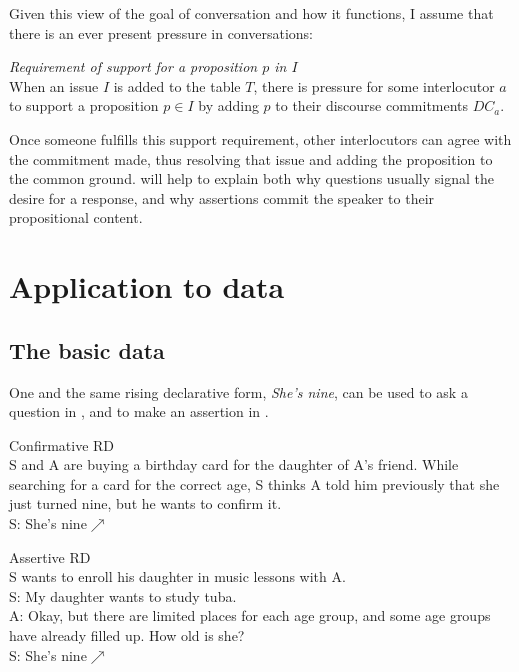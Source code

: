 \documentclass[output=paper,colorlinks,citecolor=brown]{langscibook}
\begin{document}
	Given this view of the goal of conversation and how it functions, I assume that there is an ever present pressure in conversations:
	
	\exa \emph{Requirement of support for a proposition $p$ in $I$}\\
	When an issue $I$ is added to the table $T$, there is pressure for some interlocutor $a$ to support a proposition $p \in I$ by adding $p$ to their discourse commitments $DC_a$. \label{support}
	\z
	
	Once someone fulfills this support requirement, other interlocutors can agree with the commitment made, thus resolving that issue and adding the proposition to the common ground.  will help to explain both why questions usually signal the desire for a response, and why assertions commit the speaker to their propositional content.
	
	
	
	
\section{Application to data} \label{data1}

	
\subsection{The basic data}
	
	One and the same rising declarative form, \emph{She's nine}\rise, can be used to ask a question in , and to make an assertion in .
	
\begin{exe}
  Confirmative RD\\
S and A are buying a birthday card for the daughter of A's friend. While searching for a card for the correct age, S thinks A told him previously that she just turned nine, but he wants to confirm it.\\
S: She's nine$\nearrow$
\end{exe}
\begin{exe}
  Assertive RD\\
S wants to enroll his daughter in music lessons with A. \\ 
S: My daughter wants to study tuba. \\
A: Okay, but there are limited places for each age group, and some age groups have already filled up. How old is she?\\
S: She's nine$\nearrow$
\end{exe}
	
\end{document}
